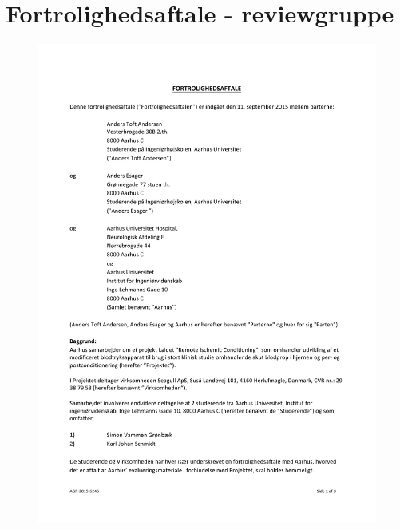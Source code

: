 \section{Fortrolighedsaftale - reviewgruppe}
\begin{figure}[H]
	\includegraphics[width = 1\textwidth]{billeder/FortrolighedsaftaleSide1.pdf}
\end{figure}
\newpage
